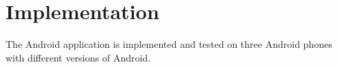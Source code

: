\section{Implementation}
The Android application is implemented and tested on three Android phones with different versions of Android.
